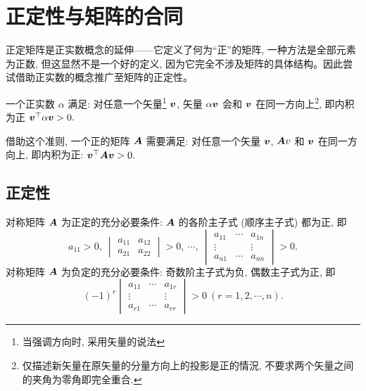 \section{正定性与矩阵的合同}

正定矩阵是正实数概念的延伸——它定义了何为“正”的矩阵, 一种方法是全部元素为正数, 但这显然不是一个好的定义, 
因为它完全不涉及矩阵的具体结构。因此尝试借助正实数的概念推广至矩阵的正定性。

一个正实数 $\alpha$ 满足: 对任意一个矢量\footnote{当强调方向时, 采用矢量的说法} $\vb*{v}$, 矢量 $\alpha\vb*{v}$ 会和 $\vb*{v}$ 在同一方向上\footnote{仅描述新矢量在原矢量的分量方向上的投影是正的情況, 不要求两个矢量之间的夹角为零角即完全重合.}, 即内积为正 $\vb*{v}^\top\alpha\vb*{v}>0.$

借助这个准则, 一个正的矩阵 $\vb*{A}$ 需要满足: 对任意一个矢量 $\vb*{v}$, $\vb*{A}v$ 和 $\vb*{v}$ 在同一方向上, 即内积为正: $\vb*{v}^\top\vb*{A}\vb*{v}>0.$

\subsection{正定性}

\begin{theorem}[Hurwitz 定理]
    对称矩阵 $\vb*{A}$ 为正定的充分必要条件: $\vb*{A}$ 的各阶主子式 (顺序主子式) 都为正, 即
    $$a_{11}>0,~\begin{vmatrix}
            a_{11} & a_{12} \\
            a_{21} & a_{22}
        \end{vmatrix}>0,~\cdots,~\begin{vmatrix}
            a_{11} & \cdots & a_{1n}  \\
            \vdots &        & \vdots\ \\
            a_{n1} & \cdots & a_{nn}
        \end{vmatrix}>0.$$
    对称矩阵 $\vb*{A}$  为负定的充分必要条件: 奇数阶主子式为负, 偶数主子式为正, 即
    $$(-1)^r\begin{vmatrix}
            a_{11} & \cdots & a_{1r} \\
            \vdots &        & \vdots \\
            a_{r1} & \cdots & a_{rr}
        \end{vmatrix}>0~  (r=1,2,\cdots ,n).$$
    \label{Hurwitztheorem}
\end{theorem}

